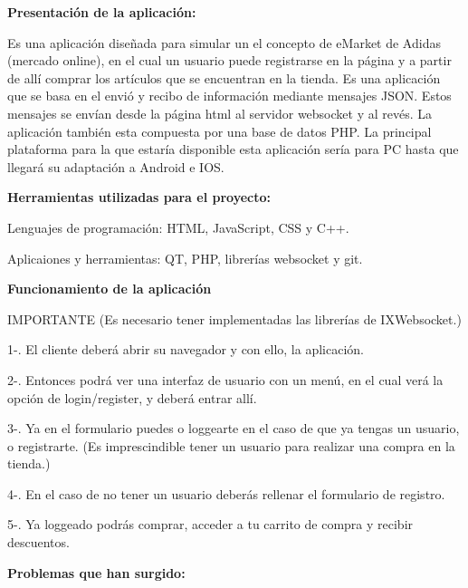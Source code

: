 



{\bfseries Presentación de la aplicación\+:}

Es una aplicación diseñada para simular un el concepto de e\+Market de Adidas (mercado online), en el cual un usuario puede registrarse en la página y a partir de allí comprar los artículos que se encuentran en la tienda. Es una aplicación que se basa en el envió y recibo de información mediante mensajes J\+S\+ON. Estos mensajes se envían desde la página html al servidor websocket y al revés. La aplicación también esta compuesta por una base de datos P\+HP. La principal plataforma para la que estaría disponible esta aplicación sería para PC hasta que llegará su adaptación a Android e I\+OS.

{\bfseries Herramientas utilizadas para el proyecto\+:}


\begin{DoxyItemize}
\item Lenguajes de programación\+: H\+T\+ML, Java\+Script, C\+SS y C++.
\item Aplicaiones y herramientas\+: QT, P\+HP, librerías websocket y git.
\end{DoxyItemize}

{\bfseries Funcionamiento de la aplicación}

I\+M\+P\+O\+R\+T\+A\+N\+TE (Es necesario tener implementadas las librerías de I\+X\+Websocket.)

1-\/. El cliente deberá abrir su navegador y con ello, la aplicación.

2-\/. Entonces podrá ver una interfaz de usuario con un menú, en el cual verá la opción de login/register, y deberá entrar allí.

3-\/. Ya en el formulario puedes o loggearte en el caso de que ya tengas un usuario, o registrarte. (Es imprescindible tener un usuario para realizar una compra en la tienda.)

4-\/. En el caso de no tener un usuario deberás rellenar el formulario de registro.

5-\/. Ya loggeado podrás comprar, acceder a tu carrito de compra y recibir descuentos.





{\bfseries Problemas que han surgido\+:}



